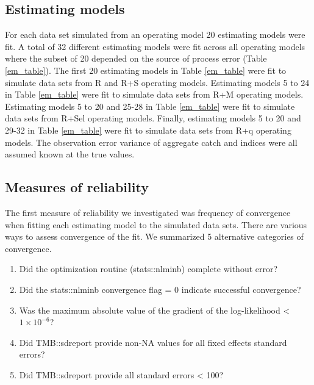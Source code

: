 \documentclass[
  12pt,
]{article}
\providecommand{\tightlist}{%
  \setlength{\itemsep}{0pt}\setlength{\parskip}{0pt}}
\begin{document}
\hypertarget{estimating-models}{%
\subsection*{Estimating models}\label{estimating-models}}

For each data set simulated from an operating model 20 estimating models
were fit. A total of 32 different estimating models were fit across all
operating models where the subset of 20 depended on the source of
process error (Table \ref{em_table}). The first 20 estimating models in
Table \ref{em_table} were fit to simulate data sets from R and R+S
operating models. Estimating models 5 to 24 in Table \ref{em_table} were
fit to simulate data sets from R+M operating models. Estimating models 5
to 20 and 25-28 in Table \ref{em_table} were fit to simulate data sets
from R+Sel operating models. Finally, estimating models 5 to 20 and
29-32 in Table \ref{em_table} were fit to simulate data sets from R+q
operating models. The observation error variance of aggregate catch and
indices were all assumed known at the true values.

\hypertarget{measures-of-reliability}{%
\subsection*{Measures of reliability}\label{measures-of-reliability}}

The first measure of reliability we investigated was frequency of
convergence when fitting each estimating model to the simulated data
sets. There are various ways to assess convergence of the fit. We
summarized 5 alternative categories of convergence.

\begin{enumerate}
\def\labelenumi{\arabic{enumi}.}
\tightlist
\item
  Did the optimization routine (stats::nlminb) complete without error?
\item
  Did the stats::nlminb convergence flag = 0 indicate successful
  convergence?
\item
  Was the maximum absolute value of the gradient of the log-likelihood
  \textless{} \(1\times10^{-6}\)?
\item
  Did TMB::sdreport provide non-NA values for all fixed effects standard
  errors?
\item
  Did TMB::sdreport provide all standard errors \textless{} 100?
\end{enumerate}
\end{document}
